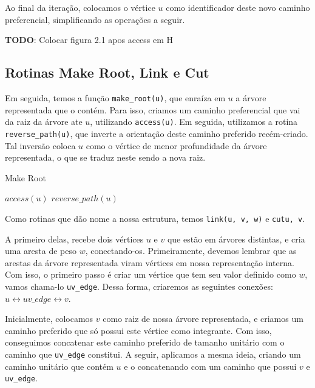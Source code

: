 Ao final da iteração, colocamos o vértice $u$ como identificador deste novo caminho preferencial, simplificando as operações a seguir.

\begin{center}
    \textbf{TODO}: Colocar figura 2.1 apos access em H
\end{center}

\subsection{Rotinas Make Root, Link e Cut}
\label{subsection:lct-make-root}

Em seguida, temos a função \texttt{make\_root(u)}, que enraíza em $u$ a árvore representada que o contém. Para isso, criamos um caminho preferencial que vai da raiz da árvore ate $u$, utilizando \texttt{access(u)}. Em seguida, utilizamos a rotina \texttt{reverse\_path(u)}, que inverte a orientação deste caminho preferido recém-criado. Tal inversão coloca $u$ como o vértice de menor profundidade da árvore representada, o que se traduz neste sendo a nova raiz.

\begin{algorithm}[h!]
    \caption{Make Root}\label{lct:make-root}
    \begin{algorithmic}
        \State $access(u)$
        \State $reverse\_path(u)$
        \EndFunction
    \end{algorithmic}
\end{algorithm}

Como rotinas que dão nome a nossa estrutura, temos \texttt{link(u, v, w)} e \texttt{cut{u, v}}.

A primeiro delas, recebe dois vértices $u$ e $v$ que estão em árvores distintas, e cria uma aresta de peso $w$, conectando-os. Primeiramente, devemos lembrar que as arestas da árvore representada viram vértices em nossa representação interna. Com isso, o primeiro passo é criar um vértice que tem seu valor definido como $w$, vamos chama-lo \texttt{uv\_edge}. Dessa forma, criaremos as seguintes conexões: $u \leftrightarrow uv\_edge \leftrightarrow v$.

Inicialmente, colocamos $v$ como raiz de nossa árvore representada, e criamos um caminho preferido que só possui este vértice como integrante. Com isso, conseguimos concatenar este caminho preferido de tamanho unitário com o caminho que \texttt{uv\_edge} constitui. A seguir, aplicamos a mesma ideia, criando um caminho unitário que contém $u$ e o concatenando com um caminho que possui $v$ e \texttt{uv\_edge}.

